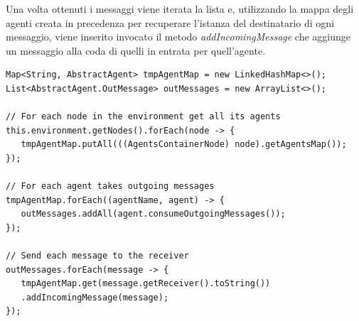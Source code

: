 \documentclass[12pt,a4paper,openright,twoside]{report}
\begin{document}
Una volta ottenuti i messaggi viene iterata la lista e, utilizzando la mappa degli agenti creata in precedenza per recuperare l'istanza del destinatario di ogni messaggio, viene inserito invocato il metodo \textit{addIncomingMessage} che aggiunge un messaggio alla coda di quelli in entrata per quell'agente.
\medskip
\begin{lstlisting}[label={lst:PostmanMethod},caption={Metodo dell'agente Postman}]
Map<String, AbstractAgent> tmpAgentMap = new LinkedHashMap<>();
List<AbstractAgent.OutMessage> outMessages = new ArrayList<>();

// For each node in the environment get all its agents
this.environment.getNodes().forEach(node -> {
   tmpAgentMap.putAll(((AgentsContainerNode) node).getAgentsMap());
});

// For each agent takes outgoing messages
tmpAgentMap.forEach((agentName, agent) -> {
   outMessages.addAll(agent.consumeOutgoingMessages());
});

// Send each message to the receiver
outMessages.forEach(message -> {
   tmpAgentMap.get(message.getReceiver().toString())
   .addIncomingMessage(message);
});
\end{lstlisting}
\end{document}
